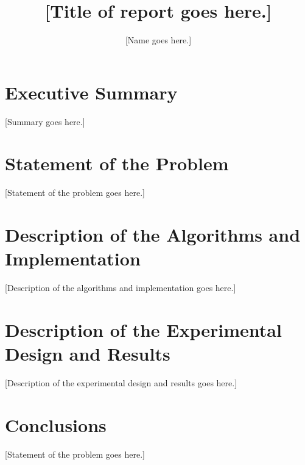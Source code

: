 \documentclass[11pt]{article}
\author{[Name goes here.]}
\title{[Title of report goes here.]}
\begin{document}
\maketitle

\section{Executive Summary}

[Summary goes here.]

\section{Statement of the Problem}

[Statement of the problem goes here.]


\section{Description of the Algorithms and Implementation}

[Description of the algorithms and implementation goes here.]

\section{Description of the Experimental Design and Results}

[Description of the experimental design and results goes here.]

\section{Conclusions}

[Statement of the problem goes here.]
\end{document}
